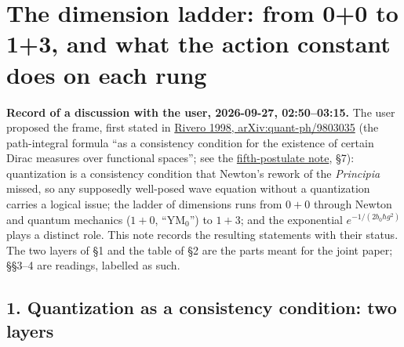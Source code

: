 \documentclass[11pt,a4paper]{article}
\begin{document}
\hypertarget{the-dimension-ladder-from-00-to-13-and-what-the-action-constant-does-on-each-rung}{%
\section{The dimension ladder: from 0+0 to 1+3, and what the action
constant does on each
rung}\label{the-dimension-ladder-from-00-to-13-and-what-the-action-constant-does-on-each-rung}}

\textbf{Record of a discussion with the user, 2026-09-27, 02:50--03:15.}
The user proposed the frame, first stated in
\href{https://arxiv.org/abs/quant-ph/9803035}{Rivero 1998,
arXiv:quant-ph/9803035} (the path-integral formula ``as a consistency
condition for the existence of certain Dirac measures over functional
spaces''; see the \href{principia-fifth-postulate.md}{fifth-postulate
note}, §7): quantization is a consistency condition that Newton's rework
of the \emph{Principia} missed, so any supposedly well-posed wave
equation without a quantization carries a logical issue; the ladder of
dimensions runs from \(0+0\) through Newton and quantum mechanics
(\(1+0\), ``YM\(_0\)'') to \(1+3\); and the exponential
\(e^{-1/(2b_0\hbar g^2)}\) plays a distinct role. This note records the
resulting statements with their status. The two layers of §1 and the
table of §2 are the parts meant for the joint paper; §§3--4 are
readings, labelled as such.

\hypertarget{quantization-as-a-consistency-condition-two-layers}{%
\subsection{1. Quantization as a consistency condition: two
layers}\label{quantization-as-a-consistency-condition-two-layers}}
\end{document}
